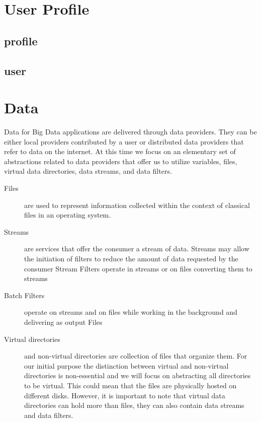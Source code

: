 \documentclass[9pt,twocolumn,twoside]{styles/osajnl}
\begin{document}
\section{User Profile}

\subsection{profile}



\subsection{user}



\section{Data}

Data for Big Data applications are delivered through data
providers. They can be either local providers contributed by a user or
distributed data providers that refer to data on the internet. At this
time we focus on an elementary set of abstractions related to data
providers that offer us to utilize variables, files, virtual data
directories, data streams, and data filters.

\begin{description}
\item[Files] are used to represent information collected within the context
of classical files in an operating system. 

\item[Streams] are services that offer the consumer a stream of data. Streams may allow the initiation of filters to reduce the amount of data requested by the consumer 
Stream Filters operate in streams or on files converting them to streams 

\item[Batch Filters] operate on streams and on files while working in
  the background and delivering as output Files 

\item[Virtual directories] and non-virtual directories are collection
  of files that organize them. For our initial purpose the distinction
  between virtual and non-virtual directories is non-essential and we
  will focus on abstracting all directories to be virtual. This could
  mean that the files are physically hosted on different
  disks. However, it is important to note that virtual data
  directories can hold more than files, they can also contain data
  streams and data filters.

\end{description}
\end{document}
